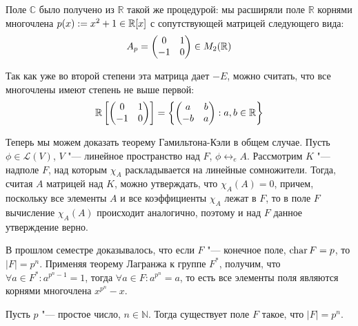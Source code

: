 \begin{note}
	Поле $\mathbb{C}$ было получено из $\mathbb{R}$ такой же процедурой: мы расширяли поле $\mathbb{R}$ корнями многочлена $p(x) := x^2 + 1 \in \mathbb{R}[x]$ с сопутствующей матрицей следующего вида:
	\[A_p = \begin{pmatrix}0&1\\-1&0\end{pmatrix} \in M_2(\mathbb{R})\]
	
	Так как уже во второй степени эта матрица дает $-E$, можно считать, что все многочлены имеют степень не выше первой:
	\[\mathbb{R}\left[\begin{pmatrix}0&1\\-1&0\end{pmatrix}\right] = \left\{\begin{pmatrix}a&b\\-b&a\end{pmatrix} : a, b \in \mathbb{R}\right\}\]
\end{note}

\begin{note}
	Теперь мы можем доказать теорему Гамильтона-Кэли в общем случае. Пусть $\phi \in \mathcal{L}(V)$, $V$ "--- линейное пространство над $F$, $\phi \leftrightarrow_e A$. Рассмотрим $K$ "--- надполе $F$, над которым $\chi_A$ раскладывается на линейные сомножители. Тогда, считая $A$ матрицей над $K$, можно утверждать, что $\chi_A(A) = 0$, причем, поскольку все элементы $A$ и все коэффициенты $\chi_A$ лежат в $F$, то в поле $F$ вычисление $\chi_A(A)$ происходит аналогично, поэтому и над $F$ данное утверждение верно.
\end{note}

\begin{note}
	В прошлом семестре доказывалось, что если $F$ "--- конечное поле, $\operatorname{char}{F} = p$, то $|F| = p^n$. Применяя теорему Лагранжа к группе $F^*$, получим, что $\forall a \in F^*: a^{p^n - 1} = 1$, тогда $\forall a \in F: a^{p^n} = a$, то есть все элементы поля являются корнями многочлена $x^{p^n} - x$.
\end{note}

\begin{theorem}
	Пусть $p$ "--- простое число, $n \in \mathbb{N}$. Тогда существует поле $F$ такое, что $|F| = p^n$.
\end{theorem}

